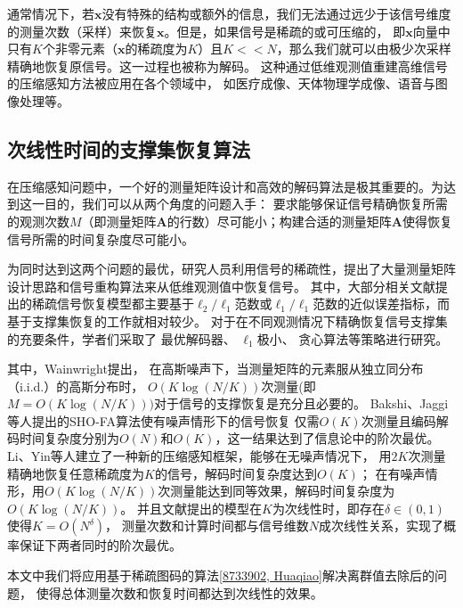 \documentclass[AutoFakeBold]{LZUThesis}
\begin{document}
通常情况下，若$\mathbf{x}$没有特殊的结构或额外的信息，我们无法通过远少于该信号维度的测量次数（采样）来恢复$\mathbf{x}$。但是，如果信号是稀疏的或可压缩的，
即$\mathbf{x}$向量中只有$K$个非零元素（$\mathbf{x}$的稀疏度为$K$）且$K << N$，那么我们就可以由极少次采样精确地恢复原信号。这一过程也被称为解码。
这种通过低维观测值重建高维信号的压缩感知方法被应用在各个领域中，
如医疗成像\cite{PMID:17969013}、天体物理学成像\cite{Wiaux_2009}、语音与图像处理\cite{elad2010sparse}等。

\subsection{次线性时间的支撑集恢复算法}

在压缩感知问题中，一个好的测量矩阵设计和高效的解码算法是极其重要的。为达到这一目的，我们可以从两个角度的问题入手：
要求能够保证信号精确恢复所需的观测次数$M$（即测量矩阵$\mathbf{A}$的行数）尽可能小；构建合适的测量矩阵$\mathbf{A}$使得恢复信号所需的时间复杂度尽可能小。

为同时达到这两个问题的最优，研究人员利用信号的稀疏性，提出了大量测量矩阵设计思路和信号重构算法来从低维观测值中恢复信号。
其中，大部分相关文献提出的稀疏信号恢复模型都主要基于$\ell_2 / \ell_1$范数或$\ell_1 / \ell_1$范数的近似误差指标，而基于支撑集恢复\cite{gilbert2010sparse}的工作就相对较少。
对于在不同观测情况下精确恢复信号支撑集的充要条件，学者们采取了
最优解码器\cite{861970, wainwright2007informationtheoretic}、
$\ell_1$极小\cite{10.1214/08-AOS653}、
贪心算法\cite{5895106}等策略进行研究。

其中，Wainwright\cite{wainwright2007informationtheoretic}提出，
在高斯噪声下，当测量矩阵的元素服从独立同分布（i.i.d.）的高斯分布时，
$O(K \log(N/K))$次测量(即$M = O(K \log(N/K)))$对于信号的支撑恢复是充分且必要的。
Bakshi、Jaggi\cite{7185441}等人提出的SHO-FA算法使有噪声情形下的信号恢复
仅需$O(K)$次测量且编码解码时间复杂度分别为$O(N)$和$O(K)$，这一结果达到了信息论中的阶次最优。
Li、Yin\cite{8733902}等人建立了一种新的压缩感知框架，能够在无噪声情况下，
用$2K$次测量精确地恢复任意稀疏度为$K$的信号，解码时间复杂度达到$O(K)$；
在有噪声情形，用$O(K \log(N/K))$次测量能达到同等效果，解码时间复杂度为$O(K \log(N/K))$。
并且文献\cite{8733902}提出的模型在$K$为次线性时，即存在$\delta \in (0,1)$使得$K = O(N^\delta)$，
测量次数和计算时间都与信号维数$N$成次线性关系，实现了概率保证下两者同时的阶次最优。

本文中我们将应用基于稀疏图码的算法\ref{8733902, Huaqiao}解决离群值去除后的问题，
使得总体测量次数和恢复时间都达到次线性的效果。
\end{document}
